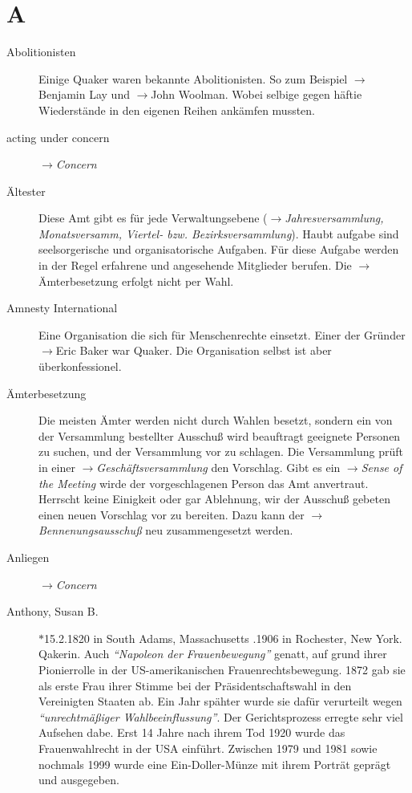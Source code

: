 \section*{A}

\articlesize
\begin{description}

 \item[Abolitionisten] Einige Quaker waren bekannte Abolitionisten. So zum
Beispiel $\to$Benjamin Lay und $\to$John Woolman. Wobei selbige gegen häftie
Wiederstände in den eigenen Reihen ankämfen mussten.

 \item[acting under concern] $\to$\textit{Concern}

 \item[Ältester] Diese Amt gibt es für jede Verwaltungsebene
($\to$\textit{Jahresversammlung, Monatsversamm, Viertel- bzw.
Bezirksversammlung}). Haubt aufgabe sind seelsorgerische und organisatorische
Aufgaben. Für diese Aufgabe werden in der Regel erfahrene und angesehende
Mitglieder berufen. Die $\to$Ämterbesetzung erfolgt nicht per Wahl.

 \item[Amnesty International] Eine Organisation die sich für Menschenrechte
einsetzt. Einer der Gründer $\to$Eric Baker war Quaker. Die Organisation selbst
ist aber überkonfessionel.

 \item[Ämterbesetzung]  Die meisten Ämter werden nicht durch Wahlen besetzt,
sondern ein von der Versammlung bestellter Ausschuß wird beauftragt geeignete
Personen zu suchen, und der Versammlung vor zu schlagen. Die Versammlung prüft
in einer $\to$\textit{Geschäftsversammlung} den Vorschlag. Gibt es ein
$\to$\textit{Sense of the Meeting} wirde der vorgeschlagenen Person das Amt
anvertraut. Herrscht keine Einigkeit oder gar Ablehnung, wir der Ausschuß
gebeten einen neuen Vorschlag vor zu bereiten. Dazu kann der
$\to$\textit{Bennenungsausschuß} neu zusammengesetzt werden.

 \item[Anliegen] $\to$\textit{Concern}

 \item[Anthony, Susan B.] $\ast$15.2.1820 in South Adams, Massachusetts
.1906 in Rochester, New York. Qakerin. Auch \textit{"`Napoleon der
Frauenbewegung"'} genatt, auf grund ihrer Pionierrolle in der US-amerikanischen
Frauenrechtsbewegung. 1872 gab sie als erste Frau ihrer Stimme bei der
Präsidentschaftswahl in den Vereinigten Staaten ab. Ein Jahr spähter wurde sie
dafür verurteilt wegen \textit{"`unrechtmäßiger Wahlbeeinflussung"'}. Der
Gerichtsprozess erregte sehr viel Aufsehen dabe. Erst 14 Jahre nach ihrem Tod
1920 wurde das Frauenwahlrecht in der USA einführt. Zwischen 1979 und 1981 sowie
nochmals 1999 wurde eine Ein-Doller-Münze mit ihrem Porträt geprägt und
ausgegeben.


\end{description}
